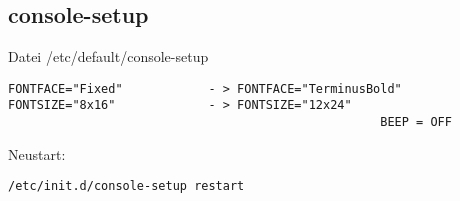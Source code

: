 \subsection{console-setup}

Datei /etc/default/console-setup
\begin{verbatim}
FONTFACE="Fixed"			- > FONTFACE="TerminusBold"
FONTSIZE="8x16"				- > FONTSIZE="12x24"
													BEEP = OFF
\end{verbatim}
Neustart:
\begin{verbatim}
/etc/init.d/console-setup restart
\end{verbatim}

